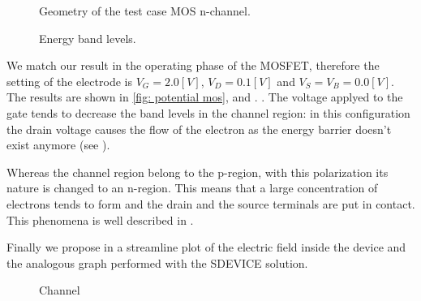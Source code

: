 \vspace{1cm}

\begin{figure}[!h]
\centering
{}
\hspace{0.5cm}
\caption{Geometry of the test case MOS n-channel.}
\label{fig: mos geometry}
\end{figure}




\begin{figure}[!h]
\centering
{}
\caption{Energy band levels.}
\label{fig: energy levels MOS}
\end{figure}


We match our result in the operating phase of the MOSFET, therefore the setting of the electrode is $V_G=2.0[V]$, $V_D=0.1[V]$ and $V_S=V_B=0.0[V]$. The results are shown in \ref{fig: potential mos},  and . . The voltage applyed to the gate tends to decrease the band levels in the channel region: in this configuration the drain voltage causes the flow of the electron as the energy barrier doesn't exist anymore (see ).

Whereas the channel region belong to the p-region, with this polarization its nature is changed to an n-region. This means that a large concentration of electrons tends to form and the drain and the source terminals are put in contact. This phenomena is well described in .

Finally we propose in  a streamline plot of the electric field inside the device and the analogous graph performed with the SDEVICE solution.

\vspace{0.5cm}

\begin{figure}[!h]
\centering
{}
\hspace{1cm}
\caption{Channel}
\label{fig: channel figures}
\end{figure}




